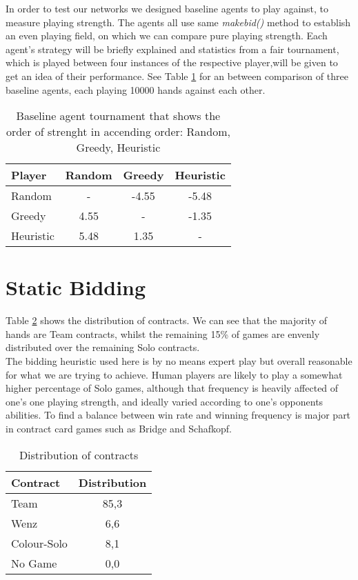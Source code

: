 In order to test our networks we designed baseline agents to play against, to measure playing strength.
The agents all use same \textit{makebid()} method to establish an even playing field, on which we can compare pure
playing strength.
Each agent's strategy will be briefly explained and statistics from a fair tournament, which is played between four
instances of the respective player,will be given to get an idea of their performance.
\newline
See Table \ref{tab:baselinevs} for an between comparison of three baseline agents, each playing 10000 hands
against each other.
\begin{table}[!h]
    \centering
    \begin{tabular}{lccc}
        \toprule
        Player    & Random & Greedy & Heuristic \\
        \midrule
        Random    & -      & -4.55  & -5.48     \\
        Greedy    & 4.55   & -      & -1.35     \\
        Heuristic & 5.48   & 1.35   & -         \\
        \bottomrule
    \end{tabular}
    \caption{Baseline agent tournament that shows the order of strenght in accending order: Random, Greedy, Heuristic}
    \label{tab:baselinevs}
\end{table}


\section{Static Bidding}
Table \ref{tab:distributionBidding} shows the distribution of contracts.
We can see that the majority of hands are Team contracts, whilst the remaining 15\% of games are envenly distributed
over the remaining Solo contracts.\\
The bidding heuristic used here is by no means expert play but overall reasonable for what we are trying to achieve.
Human players are likely to play a somewhat higher percentage of Solo games, although that frequency is heavily
affected of one's one playing strength, and ideally varied according to one's opponents abilities.
To find a balance between win rate and winning frequency is major part in contract card games such as Bridge and
Schafkopf.
\begin{table}[!h]
    \centering
    \begin{tabular}{lc}
        \toprule
        Contract    & Distribution \\
        \midrule
        Team        & 85,3         \\
        Wenz        & 6,6          \\
        Colour-Solo & 8,1          \\
        No Game     & 0,0          \\
        \bottomrule
    \end{tabular}
    \caption{Distribution of contracts}
    \label{tab:distributionBidding}
\end{table}


